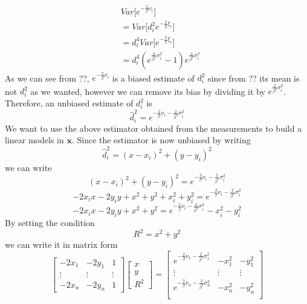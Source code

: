 \documentclass[12pt,twoside]{report}
\begin{document}
\begin{align}
    &Var\bigg[e^{-\frac{2}{\beta}\nu_i}\bigg]\\
    &=Var\bigg[d_i^2e^{-\frac{2}{\beta}\xi_i}\bigg]\\
    &=d_i^4Var\bigg[e^{-\frac{2}{\beta}\xi_i}\bigg]\\
    &=d_i^4(e^{\frac{4}{\beta^2}\sigma_i^2}-1)e^{\frac{4}{\beta^2}\sigma^2_i}
\end{align}
As we can see from ??, $e^{-\frac{2}{\beta}\nu_i}$ is a biased estimate of $d_i^2$ since from ?? its mean is not $d_i^2$ as we wanted, however we can remove its bias by dividing it by $e^{\frac{2}{\beta^2}\sigma^2_i}$. Therefore, an unbiased estimate of $d_i^2$ is 
\begin{equation}
    \hat{d}_i^2=e^{-\frac{2}{\beta}\nu_i-\frac{2}{\beta^2}\sigma^2_i}
\end{equation}
We want to use the above estimator obtained from the measurements to build a linear models in $\mathbf{x}$. Since the estimator is now unbiased by writing 
\begin{equation}
    \hat{d}_i^2=(x-x_i)^2+(y-y_i)^2
\end{equation}
we can write
\begin{equation}
    (x-x_i)^2+(y-y_i)^2=e^{-\frac{2}{\beta}\nu_i-\frac{2}{\beta^2}\sigma^2_i}
\end{equation}
\begin{equation}
    -2x_ix-2y_iy+x^2+y^2+x_i^2+y_i^2=e^{-\frac{2}{\beta}\nu_i-\frac{2}{\beta^2}\sigma^2_i}
\end{equation}
\begin{equation}
    -2x_ix-2y_iy+x^2+y^2=e^{-\frac{2}{\beta}\nu_i-\frac{2}{\beta^2}\sigma^2_i}-x_i^2-y_i^2
\end{equation}
By setting the condition 
\begin{equation}
R^2=x^2+y^2    
\end{equation}
we can write it in matrix form
\begin{equation}
    \begin{bmatrix}
        -2x_1 & -2y_1 & 1\\
        \vdots&\vdots&\vdots\\
        -2x_n & -2y_n & 1
    \end{bmatrix}
    \begin{bmatrix}
        x\\
        y\\
        R^2
    \end{bmatrix} = 
    \begin{bmatrix}
       e^{-\frac{2}{\beta}\nu_1-\frac{2}{\beta^2}\sigma^2_1} & -x_1^2 & -y_1^2\\
        \vdots&\vdots&\vdots\\
        e^{-\frac{2}{\beta}\nu_n-\frac{2}{\beta^2}\sigma^2_n} & -x_n^2 & -y_n^2\\
    \end{bmatrix}
\end{equation}
\end{document}
